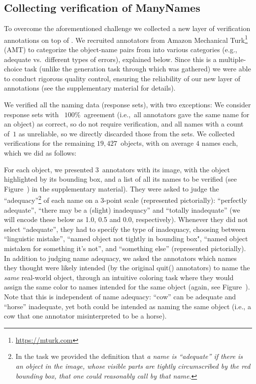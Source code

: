 \subsection{Collecting verification of ManyNames}
\label{sect:mn_verification}

To overcome the aforementioned challenge we collected a new layer of verification annotations on top of \mn.
We recruited annotators from Amazon Mechanical Turk\footnote{
	\url{https://mturk.com}
} (AMT) to categorize the object-name pairs from \mn into various categories (e.g., adequate vs.\ different types of errors), explained below.
Since this is a multiple-choice task (unlike the generation task through which \mn was gathered) we were able to conduct rigorous quality control, ensuring the reliability of our new layer of annotations (see the supplementary material for details).

We verified all the \mn naming data (response sets), with two exceptions: 
We consider response sets with ~$100$\%~agreement (i.e.,~all annotators gave the same name for an object) as correct, so do not require verification, and all names with a count of~$1$ as unreliable, so we directly discarded those from the sets.
We collected verifications for the remaining $19,427$~objects, with on average $4$ names each, which we did as follows:

For each object, we presented $3$~annotators with its image, with the object highlighted by its bounding box, and a list of all its names to be verified (see Figure~) in the supplementary material).
They were asked to judge the ``adequacy''\footnote{
	In the task we provided the definition that \textit{a name is ``adequate'' if there is an object in the image, whose visible parts are tightly circumscribed by the red bounding box, that one could reasonably call by that name}.
} of each name on a 3-point scale (represented pictorially): ``perfectly adequate'', ``there may be a (slight) inadequacy'' and ``totally inadequate'' (we will encode these below as 1.0, 0.5 and 0.0, respectively).
Whenever they did not select ``adequate'', they had to specify the type of inadequacy, choosing between ``linguistic mistake'', ``named object not tightly in bounding box",  ``named object mistaken for something it's not'', and ``something else'' (represented pictorially).
In addition to judging name adequacy, we asked the annotators which names they thought were likely intended (by the original    quit()
 \mn annotators) to name the \textit{same} real-world object, 
through an intuitive coloring task where they would assign the same color to names intended for the same object (again, see Figure~).
Note that this is independent of name adequacy: ``cow'' can be adequate and ``horse'' inadequate, yet both could be intended as naming the same object (i.e., a cow that one annotator misinterpreted to be a horse).

